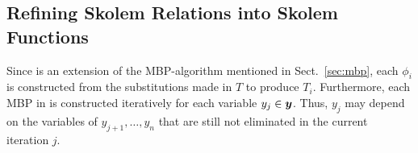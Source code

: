 \skolemcases


\subsection{Refining Skolem Relations into Skolem Functions}
\label{sec:new}

\localfactoralg


Since \aeval is an extension of the MBP-algorithm mentioned in Sect.~\ref{sec:mbp},
each $\phi_i$ is constructed from the substitutions made in $T$ to produce $T_{i}$.
Furthermore, 
%
each MBP in \aeval is constructed iteratively for each variable $y_j \in \vy$.
Thus, $y_j$ may depend on the variables of $y_{j+1},\ldots, y_{n}$ that are still not eliminated in the current iteration $j$.

